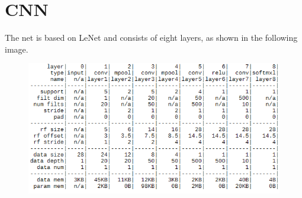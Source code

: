 \section{CNN}

The net is based on LeNet and consists of eight layers, as shown in the following image.

\begin{figure}[h]
	\begin{center}
		\includegraphics[width=1\textwidth]{img/cnn.png}
	\end{center}
	\label{fig:cnn}
\end{figure}